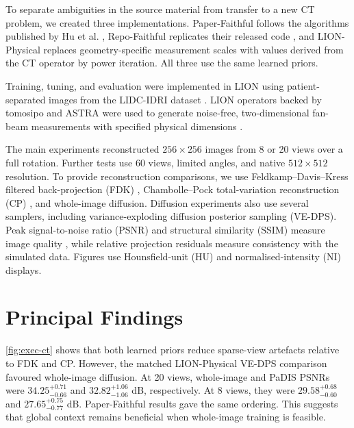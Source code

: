 \documentclass[11pt,a4paper]{article}
\begin{document}
To separate ambiguities in the source material from transfer to a new CT problem, we created three implementations. Paper-Faithful follows the algorithms published by Hu et al. \cite{hu_learning_2024}, Repo-Faithful replicates their released code \cite{hu_jasonhu4padis_2026-1}, and LION-Physical replaces geometry-specific measurement scales with values derived from the CT operator by power iteration. All three use the same learned priors.

Training, tuning, and evaluation were implemented in LION \cite{noauthor_cambridgecialion_2026} using patient-separated images from the LIDC-IDRI dataset \cite{armato_iii_data_2015-1}. LION operators backed by tomosipo and ASTRA were used to generate noise-free, two-dimensional fan-beam measurements with specified physical dimensions \cite{hendriksen_tomosipo_2021,van_aarle_fast_2016}.

The main experiments reconstructed $256\times256$ images from 8 or 20 views over a full rotation. Further tests use 60 views, limited angles, and native $512\times512$ resolution. To provide reconstruction comparisons, we use Feldkamp--Davis--Kress filtered back-projection (FDK) \cite{feldkamp_practical_1984}, Chambolle--Pock total-variation reconstruction (CP) \cite{rudin_nonlinear_1992,chambolle_first-order_2011}, and whole-image diffusion. Diffusion experiments also use several samplers, including variance-exploding diffusion posterior sampling (VE-DPS). Peak signal-to-noise ratio (PSNR) and structural similarity (SSIM) measure image quality \cite{wang_image_2004}, while relative projection residuals measure consistency with the simulated data. Figures use Hounsfield-unit (HU) and normalised-intensity (NI) displays.

\section{Principal Findings}

\autoref{fig:exec-ct} shows that both learned priors reduce sparse-view artefacts relative to FDK and CP. However, the matched LION-Physical VE-DPS comparison \cite{chung_diffusion_2022} favoured whole-image diffusion. At 20 views, whole-image and PaDIS PSNRs were $34.25^{+0.71}_{-0.66}$ and $32.82^{+1.06}_{-1.06}$ dB, respectively. At 8 views, they were $29.58^{+0.68}_{-0.60}$ and $27.65^{+0.75}_{-0.77}$ dB. Paper-Faithful results gave the same ordering. This suggests that global context remains beneficial when whole-image training is feasible.
\end{document}
